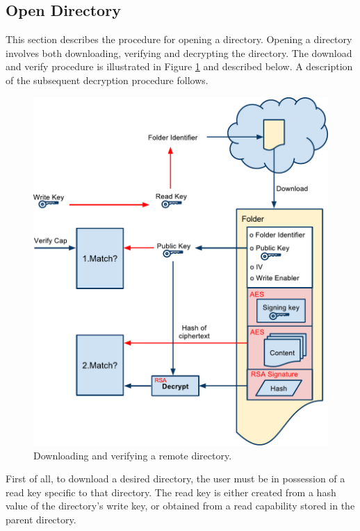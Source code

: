 \documentclass[pdftex,english,10pt,b5paper,twoside]{book}
\begin{document}
\subsection{Open Directory}

This section describes the procedure for opening a directory. Opening a
directory involves both downloading, verifying and decrypting the directory. The
download and verify procedure is illustrated in Figure \ref{fig:CS:VOD} and
described below. A description of the subsequent decryption procedure follows.

\begin{figure}[h!]
    \centering
    \includegraphics[width=\columnwidth]{VerifyOpenFolder.pdf}
    \caption{Downloading and verifying a remote directory.}
    \label{fig:CS:VOD}
\end{figure}

First of all, to download a desired directory, the user must be in
possession of a read key specific to that directory. The read key is either
created from a hash value of the directory's write key, or obtained from a read
capability stored in the parent directory.
\end{document}
